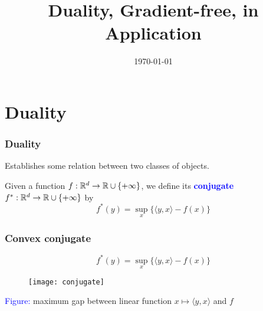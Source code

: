 \documentclass[aspectratio=149]{beamer}
\title{Duality, Gradient-free, in Application}
\date{\today}
\begin{document}
\maketitle
\frame{\tableofcontents}


\section{Duality}%

\begin{frame}
  \frametitle{Duality}
  \begin{center}
    Establishes some relation between two classes of objects.
  \end{center}
  \begin{definition}
    Given a function $f: \mathbb{R}^d \to \mathbb{R} \cup \{+\infty\}$, we define its \textcolor{blue}{\textbf{conjugate}} $f^*:\mathbb{R}^d \to \mathbb{R} \cup\{+\infty\}$ by
    \begin{equation}
      f^*(y) = \sup_x \{\langle y,x \rangle - f(x)\}
    \end{equation}
  \end{definition}
\end{frame}

\begin{frame}
  \frametitle{Convex conjugate}

  \begin{block}{}
    \begin{equation}
      f^*(y) = \sup_x \{\langle y,x \rangle - f(x)\}
    \end{equation}
  \end{block}
  \begin{minipage}{0.48\textwidth}
  \begin{figure}[ht]
    \centering
    \texttt{[image: conjugate]}
  \end{figure}
  \end{minipage}
  \begin{minipage}{0.48\textwidth}
    \vspace{2cm}
    \textcolor{blue}{Figure:} maximum gap between linear function $x \mapsto \langle y, x \rangle$ and $f$
  \end{minipage}
\end{frame}
\end{document}

